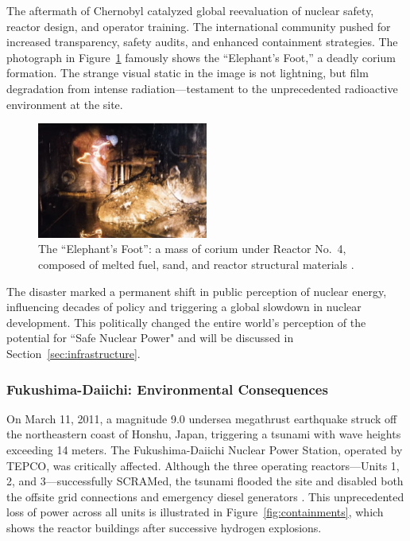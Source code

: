 \documentclass[12pt]{article}
\begin{document}
The aftermath of Chernobyl catalyzed global reevaluation of nuclear safety, reactor design, and operator training. The international community pushed for increased transparency, safety audits, and enhanced containment strategies. The photograph in Figure~\ref{fig:elephantsfoot} famously shows the “Elephant’s Foot,” a deadly corium formation. The strange visual static in the image is not lightning, but film degradation from intense radiation—testament to the unprecedented radioactive environment at the site.

\begin{figure}[H]
  \centering
  \includegraphics[width=0.5\textwidth]{elephantsfoot.png}
  \caption{The ``Elephant’s Foot'': a mass of corium under Reactor No.~4, composed of melted fuel, sand, and reactor structural materials \autocite{medvedev1991truth}.}
  \label{fig:elephantsfoot}
\end{figure}

The disaster marked a permanent shift in public perception of nuclear energy,
influencing decades of policy and triggering a global slowdown in nuclear
development. This politically changed the entire world's perception of the
potential for ``Safe Nuclear Power" and will be discussed in
Section~\ref{sec:infrastructure}.


\subsubsection*{Fukushima-Daiichi: Environmental Consequences}

On March 11, 2011, a magnitude 9.0 undersea megathrust earthquake struck off the northeastern coast of Honshu, Japan, triggering a tsunami with wave heights exceeding 14 meters. The Fukushima-Daiichi Nuclear Power Station, operated by TEPCO, was critically affected. Although the three operating reactors—Units 1, 2, and 3—successfully SCRAMed, the tsunami flooded the site and disabled both the offsite grid connections and emergency diesel generators \autocite{iaea_fukushima_report}. This unprecedented loss of power across all units is illustrated in Figure~\ref{fig:containments}, which shows the reactor buildings after successive hydrogen explosions.
\end{document}
